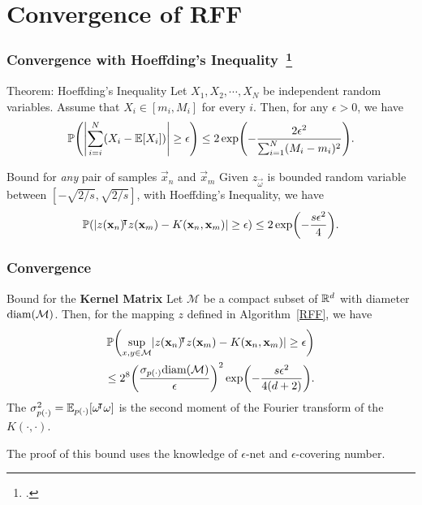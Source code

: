 \documentclass[10pt]{../formats/RU}
\begin{document}
\section{Convergence of RFF}
\begin{frame}
  \frametitle{Convergence with Hoeffding's Inequality~\footcite{vershynin_hdp}}
  \begin{alertblock}{Theorem: Hoeffding's Inequality}
    Let $X_1, X_2,\cdots, X_N$ be independent random variables. Assume that $X_i \in [m_i, M_i]$ for every $i$. Then, for any $\epsilon > 0$, we have
    \[
    \P{\abs*{\sum_{i=i}^{N}(X_i-\E{X_i})}\geq \epsilon} \leq 2\exp\parens*{-\frac{2\epsilon^2}{\sum_{i=1}^{N}(M_i-m_i)^2}}.
    \]
  \end{alertblock}
  \begin{exampleblock}{Bound for \emph{any} pair of samples $\vec{x}_n$ and $\vec{x}_m$}
    Given $z_{\vec{\omega}}$ is bounded random variable between $[-\sqrt{2/s}, \sqrt{2/s}]$, with Hoeffding's Inequality, we have
    \begin{align*}
      \P{\abs{z(\vec{x}_n)\trn z(\vec{x}_m)-K(\vec{x}_n, \vec{x}_m)}\geq \epsilon} \leq 2\exp\parens*{-\frac{s\epsilon^2}{4}}.
    \end{align*}
  \end{exampleblock}
\end{frame}
\begin{frame}
  \frametitle{Convergence}
  \begin{exampleblock}{Bound for the \textbf{Kernel Matrix}}
    Let $\mathcal{M}$ be a compact subset of $\mathbb{R}^d$ with diameter $\textnormal{diam}(\mathcal{M})$. Then, for the mapping $z$ defined in Algorithm~\ref{RFF}, we have
    \begin{align*}
      \P{\sup_{x,y\in\mathcal{M}}\abs{z(\vec{x}_n)\trn z(\vec{x}_m)-K(\vec{x}_n, \vec{x}_m)}\geq \epsilon} \\
      \leq 2^8\parens*{\frac{\sigma_{p(\cdot)}\textnormal{diam}(\mathcal{M})}{\epsilon}}^2\exp\parens*{-\frac{s\epsilon^2}{4(d+2)}}.
    \end{align*}
    The $\sigma_{p(\cdot)}^2=\mathbb{E}_{p(\cdot)}\bracks*{\vec{\omega}\trn\vec{\omega}}$ is the second moment of the Fourier transform of the $K(\cdot,\cdot)$.
  \end{exampleblock}
  The proof of this bound uses the knowledge of $\epsilon$-net and $\epsilon$-covering number.
\end{frame}
\end{document}
